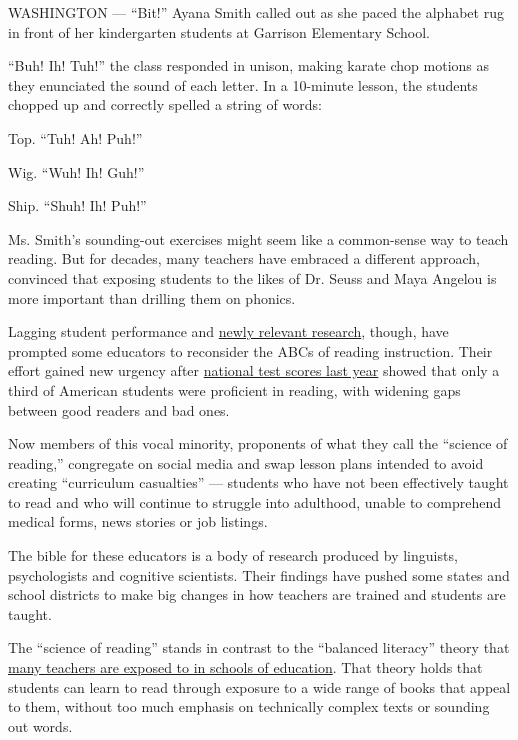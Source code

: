 WASHINGTON --- ``Bit!'' Ayana Smith called out as she paced the alphabet
rug in front of her kindergarten students at Garrison Elementary School.

``Buh! Ih! Tuh!'' the class responded in unison, making karate chop
motions as they enunciated the sound of each letter. In a 10-minute
lesson, the students chopped up and correctly spelled a string of words:

Top. ``Tuh! Ah! Puh!''

Wig. ``Wuh! Ih! Guh!''

Ship. ``Shuh! Ih! Puh!''

Ms. Smith's sounding-out exercises might seem like a common-sense way to
teach reading. But for decades, many teachers have embraced a different
approach, convinced that exposing students to the likes of Dr. Seuss and
Maya Angelou is more important than drilling them on phonics.

Lagging student performance and
\href{https://www.apmreports.org/emily-hanford}{newly relevant
research}, though, have prompted some educators to reconsider the ABCs
of reading instruction. Their effort gained new urgency after
\href{https://www.nytimes.com/2019/10/30/us/reading-scores-national-exam.html}{national
test scores last year} showed that only a third of American students
were proficient in reading, with widening gaps between good readers and
bad ones.

Now members of this vocal minority, proponents of what they call the
``science of reading,'' congregate on social media and swap lesson plans
intended to avoid creating ``curriculum casualties'' --- students who
have not been effectively taught to read and who will continue to
struggle into adulthood, unable to comprehend medical forms, news
stories or job listings.

The bible for these educators is a body of research produced by
linguists, psychologists and cognitive scientists. Their findings have
pushed some states and school districts to make big changes in how
teachers are trained and students are taught.

The ``science of reading'' stands in contrast to the ``balanced
literacy'' theory that
\href{https://www.edweek.org/ew/articles/2020/01/22/preservice-teachers-are-getting-mixed-messages-on.html}{many
teachers are exposed to in schools of education}. That theory holds that
students can learn to read through exposure to a wide range of books
that appeal to them, without too much emphasis on technically complex
texts or sounding out words.

